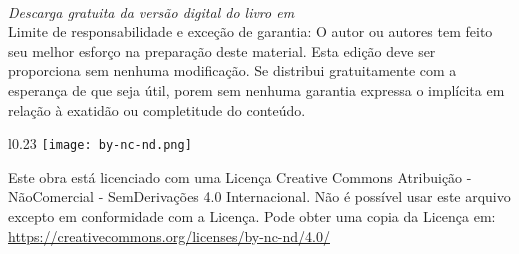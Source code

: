 ~\\

\noindent \textit{Descarga gratuita da versão digital do livro em \ImprimirLinkHomePageLivro}\\


\noindent Limite de responsabilidade e exceção de garantia: O autor ou autores tem feito
seu melhor esforço na preparação deste material.
Esta edição deve ser proporciona sem nenhuma modificação. 
Se distribui gratuitamente com a esperança de que seja útil, 
porem sem nenhuma garantia expressa o implícita em relação à exatidão ou completitude do conteúdo.


\vfill
\begin{wrapfigure}{l}{0.23\textwidth}
\texttt{[image: by-nc-nd.png]}
\end{wrapfigure}
\noindent Este obra está licenciado com uma Licença 
Creative Commons Atribuição - NãoComercial - SemDerivações 4.0 Internacional.
Não é possível usar este arquivo excepto em conformidade com a Licença. 
Pode obter uma copia da Licença em:
\url{https://creativecommons.org/licenses/by-nc-nd/4.0/}\\ %
